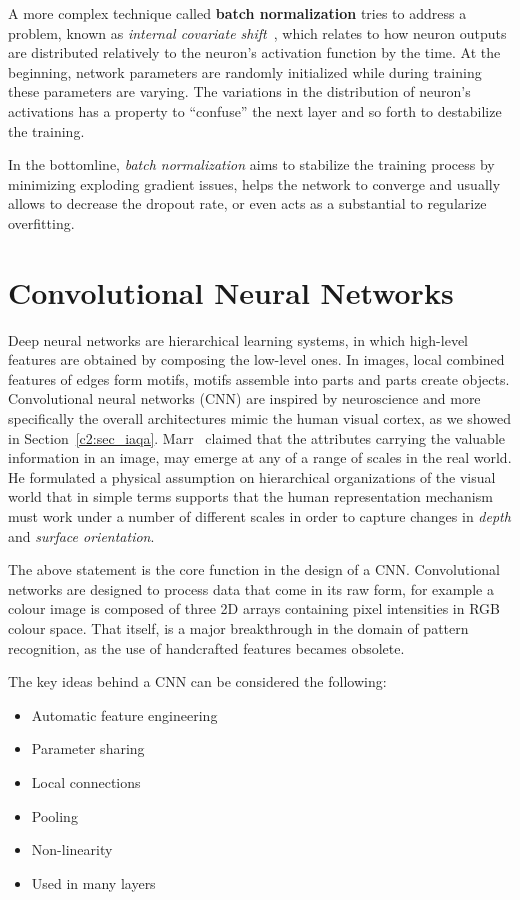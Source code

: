A more complex technique called \textbf{batch normalization} tries to address a problem, known as \textit{internal covariate shift}~\cite{ioffe2015batch}, which relates to how neuron outputs are distributed relatively to the neuron's activation function by the time. 
At the beginning, network parameters are randomly initialized while during training these parameters are varying. The variations in the distribution of neuron's activations has a property to ``confuse'' the next layer and so forth to destabilize the training.\

In the bottomline, \textit{batch normalization} aims to stabilize the training process by minimizing exploding gradient issues, helps the network to converge and usually allows to decrease the dropout rate, or even acts as a substantial to regularize overfitting.

\section{Convolutional Neural Networks}

Deep neural networks are hierarchical learning systems, in which high-level features are obtained by composing the low-level ones. In images, local combined features of edges form motifs, motifs assemble into parts and parts create objects.
Convolutional neural networks (CNN) are inspired by neuroscience and more specifically the overall architectures mimic the human visual cortex, as we showed in Section~\ref{c2:sec_iaqa}.
Marr~\cite{marr1982vision} claimed that the attributes carrying the valuable information in an image, may emerge at any of a range of scales in the real world.
He formulated a physical assumption on hierarchical organizations of the visual world that in simple terms supports that the human representation mechanism must work under a number of different scales in order to capture changes in \textit{depth} and \textit{surface orientation}.

The above statement is the core function in the design of a CNN. Convolutional networks are designed to process data that come in its raw form, for example a colour image is composed of three 2D arrays containing pixel intensities in RGB colour space. That itself, is a major breakthrough in the domain of pattern recognition, as the use of handcrafted features becames obsolete.

The key ideas behind a CNN can be considered the following:

\begin{itemize}
 \item Automatic feature engineering
 \item Parameter sharing
 \item Local connections
 \item Pooling
 \item Non-linearity
 \item Used in many layers
\end{itemize}

